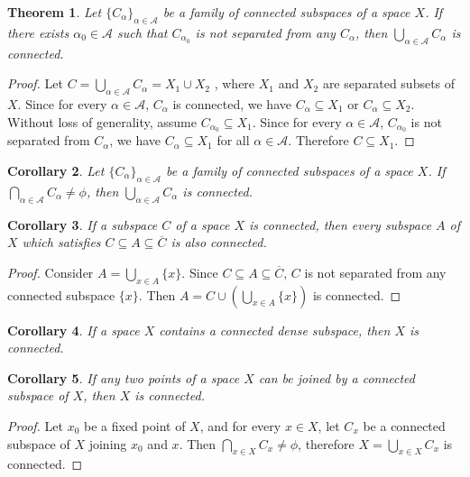 \documentclass[12pt,oneside,english]{amsbook}
\numberwithin{equation}{section} %
\numberwithin{figure}{section} %
\theoremstyle{plain}
\numberwithin{section}{chapter}
\newtheorem{thm}{Theorem}[section]
\theoremstyle{plain}
\newtheorem{corollary}[thm]{Corollary}
\begin{document}
\begin{thm}\label{connectedness:7}
  Let $\{C_{\alpha}\}_{\alpha \in \mathcal{A}}$ be a family of connected subspaces of a space $X$. If there exists $\alpha_0 \in \mathcal{A}$ such that $C_{\alpha_0}$ is not separated from any $C_{\alpha}$, then $\bigcup_{\alpha \in \mathcal{A}}C_{\alpha}$ is connected.
\end{thm}
\begin{proof}
  Let $C = \bigcup_{\alpha \in \mathcal{A}}C_{\alpha} = X_1 \cup X_2$ , where $X_1$ and $X_2$ are separated subsets of $X$. Since for every $\alpha \in \mathcal{A}$, $C_{\alpha}$ is connected, we have $C_{\alpha} \subseteq X_1$ or $C_{\alpha} \subseteq X_2$. Without loss of generality, assume $C_{\alpha_0} \subseteq X_1$. Since for every $\alpha \in \mathcal{A}$, $C_{\alpha_0}$ is not separated from $C_{\alpha}$, we have $C_{\alpha} \subseteq X_1$ for all $\alpha \in \mathcal{A}$. Therefore $C \subseteq X_1$.
\end{proof}

\begin{corollary}\label{connectedness:8}
  Let $\{C_{\alpha}\}_{\alpha \in \mathcal{A}}$ be a family of connected subspaces of a space $X$. If $\bigcap_{\alpha \in \mathcal{A}}C_{\alpha} \neq \phi$, then $\bigcup_{\alpha \in \mathcal{A}}C_{\alpha}$ is connected.
\end{corollary}

\begin{corollary}\label{connectedness:9}
  If a subspace $C$ of a space $X$ is connected, then every subspace $A$ of $X$ which satisfies $C \subseteq A \subseteq \overline{C}$ is also connected.
\end{corollary}
\begin{proof}
  Consider $A = \bigcup_{x \in A}\{x\}$. Since $C \subseteq A \subseteq \overline{C}$, $C$ is not separated from any connected subspace $\{x\}$. Then $A = C \cup (\bigcup_{x \in A}\{x\})$ is connected.
\end{proof}

\begin{corollary}\label{connectedness:10}
  If a space $X$ contains a connected dense subspace, then $X$ is connected.
\end{corollary}

\begin{corollary}\label{connectedness:11}
  If any two points of a space $X$ can be joined by a connected subspace of $X$, then $X$ is connected.
\end{corollary}
\begin{proof}
  Let $x_0$ be a fixed point of $X$, and for every $x \in X$, let $C_{x}$ be a connected subspace of $X$ joining $x_0$ and $x$. Then $\bigcap_{x \in X}C_x \neq \phi$, therefore $X = \bigcup_{x \in X} C_x$ is connected.
\end{proof}
\end{document}
